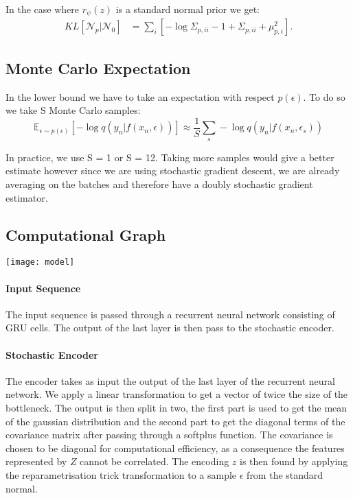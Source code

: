 \documentclass[11pt,oneside,openright]{report}
\begin{document}
In the case where $r_\psi(z)$ is a standard normal prior we get:
\begin{align}
KL[\mathcal{N}_p | \mathcal{N}_0] &= \sum_i[ -\log \Sigma_{p, ii} - 1 + \Sigma_{p, ii}+ \mu_{p, i}^2]
\label{eq:kl}.
\end{align}

\subsection{Monte Carlo Expectation}

In the lower bound we have to take an expectation with respect $p(\epsilon)$. To do so we take S Monte Carlo samples: 
 $$ \mathbb{E}_{\epsilon \sim p(\epsilon)}[- \log q(y_{n} |f(x_{n}, \epsilon))] \approx \frac{1}{S}\sum_s - \log q(y_{n} |f(x_{n}, \epsilon_s)) $$
 
 In practice, we use S = 1 or S = 12. Taking more samples would give a better estimate however since we are using stochastic gradient descent, we are already averaging on the batches and therefore have a doubly stochastic gradient estimator.

\subsection{Computational Graph}
\begin{center}
\texttt{[image: model]}
\end{center}

\paragraph{Input Sequence}
The input sequence is passed through a recurrent neural network consisting of GRU cells. The output of the last layer is then pass to the stochastic encoder.

\paragraph{Stochastic Encoder}
The encoder takes as input the output of the last layer of the recurrent neural network. We apply a linear transformation to get a vector of twice the size of the bottleneck. The output is then split in two, the first part is used to get the mean of the gaussian distribution and the second part to get the diagonal terms of the covariance matrix after passing through a softplus function. The covariance is chosen to be diagonal for computational efficiency, as a consequence the features represented by $Z$ cannot be correlated. The encoding $z$ is then found by applying the reparametrisation trick transformation to a sample $\epsilon$ from the standard normal.
\end{document}
